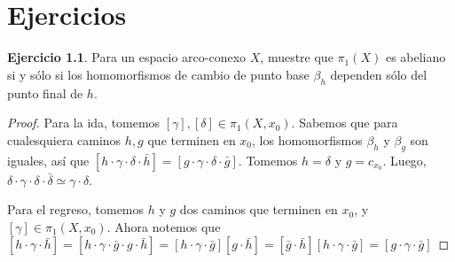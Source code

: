 \documentclass[spanish]{book}
\theoremstyle{definition}
\newtheorem*{ejer}{Ejercicio}
\begin{document}
\chapter{Ejercicios}

\begin{ejer}
	Para un espacio arco-conexo $X$, muestre que $\pi_1(X)$ es abeliano si y sólo si los homomorfismos de cambio de punto base $\beta_h$ dependen sólo del punto final de $h$.
\end{ejer}
\begin{proof}
	Para la ida, tomemos $[\gamma],[\delta]\in\pi_1(X,x_0)$. Sabemos que para cualesquiera caminos $h,g$ que terminen en $x_0$, los homomorfismos $\beta_h$ y $\beta_g$ son iguales, así que $[h\cdot \gamma\cdot\delta\cdot\bar{h}]=[g\cdot\gamma\cdot\delta\cdot\bar{g}]$. Tomemos $h=\delta$ y $g=c_{x_0}$. Luego, $\delta\cdot\gamma\cdot\delta\cdot\bar{\delta}\simeq\gamma\cdot\delta$.
	
	Para el regreso, tomemos $h$ y $g$ dos caminos que terminen en $x_0$, y $[\gamma]\in\pi_1(X,x_0)$. Ahora notemos que $[h\cdot\gamma\cdot\bar{h}]=[h\cdot\gamma\cdot \bar{g}\cdot g\cdot\bar{h}]=[h\cdot\gamma\cdot \bar{g}][g\cdot\bar{h}]=[\bar{g}\cdot\bar{h}][h\cdot\gamma\cdot \bar{g}]=[g\cdot\gamma\cdot \bar{g}]$
\end{proof}
\end{document}
